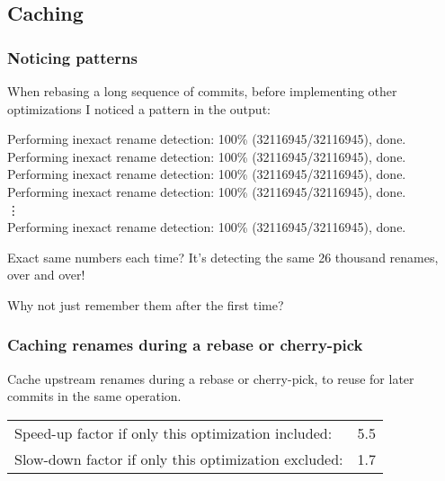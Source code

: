 \documentclass[compress,t]{beamer}
\begin{document}
\subsection{Caching}

\begin{frame}
  \frametitle{Noticing patterns}

  When rebasing a long sequence of commits, before implementing other
  optimizations I noticed a pattern in the output:
  
  \vspace*{1.0\baselineskip}
  \qquad
  \begin{minipage}{0.8\textwidth}
    {\scriptsize
    Performing inexact rename detection: 100\% (32116945/32116945), done.\\
    Performing inexact rename detection: 100\% (32116945/32116945), done.\\
    Performing inexact rename detection: 100\% (32116945/32116945), done.\\
    Performing inexact rename detection: 100\% (32116945/32116945), done.\\
    \hspace*{0.4\textwidth}\vdots\\
    Performing inexact rename detection: 100\% (32116945/32116945), done.
    }
  \end{minipage}

  \pause
  \vspace*{1.0\baselineskip}
  Exact same numbers each time?  It's detecting the same 26 thousand
  renames, over and over!

  \pause
  \vspace*{1.0\baselineskip}
  Why not just remember them after the first time?

\end{frame}


\begin{frame}
  \frametitle{Caching renames during a rebase or cherry-pick}

  Cache upstream renames during a rebase or cherry-pick, to reuse for
  later commits in the same operation.

  \pause
  \vspace*{\baselineskip}
  \begin{tabular}{lr}
    Speed-up factor if only this optimization included:  & 5.5 \\
    Slow-down factor if only this optimization excluded: & 1.7
  \end{tabular}

\end{frame}
\end{document}
